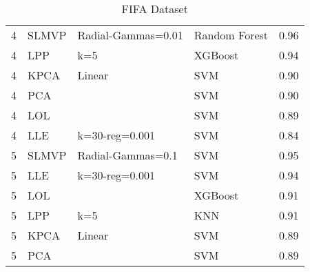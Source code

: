 \begin{table}
\begin{tabular}{llllr}
        4          & SLMVP          & Radial-Gammas=0.01 & Random Forest & 0.96     \\
        4          & LPP            & k=5                & XGBoost       & 0.94     \\
        4          & KPCA           & Linear             & SVM           & 0.90     \\
        4          & PCA            &                    & SVM           & 0.90     \\
        4          & LOL            &                    & SVM           & 0.89     \\
        4          & LLE            & k=30-reg=0.001     & SVM           & 0.84     \\
        5          & SLMVP          & Radial-Gammas=0.1  & SVM           & 0.95     \\
        5          & LLE            & k=30-reg=0.001     & SVM           & 0.94     \\
        5          & LOL            &                    & XGBoost       & 0.91     \\
        5          & LPP            & k=5                & KNN           & 0.91     \\
        5          & KPCA           & Linear             & SVM           & 0.89     \\
        5          & PCA            &                    & SVM           & 0.89     \\
        \bottomrule
    \end{tabular}

    \caption{FIFA Dataset}
    \label{annex-tab:fifa-dataset}
\end{table}

